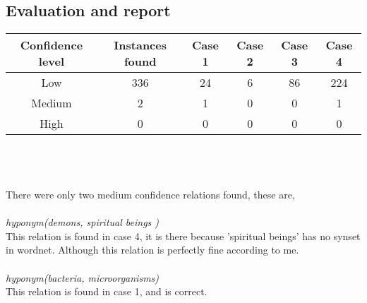 \documentclass[11pt]{article}
\begin{document}
\subsection{Evaluation and report}
\begin{tabular}{c c c c c c}
Confidence level & Instances found & Case 1 & Case 2 & Case 3 & Case 4 \\ \hline
Low & 336 & 24 & 6 & 86 & 224 \\
Medium & 2 & 1 & 0 & 0 & 1\\
High & 0 & 0 & 0 & 0 & 0 
\end{tabular} \\ \\ \\
There were only two medium confidence relations found, these are, \\ \\
\textit{hyponym(demons, spiritual beings )} \\
This relation is found in case 4, it is there because 'spiritual beings' has no synset in wordnet. Although this relation is perfectly fine according to me. \\ \\ 
\textit{hyponym(bacteria, microorganisms)}\\
This relation is found in case 1, and is correct.
\end{document}
